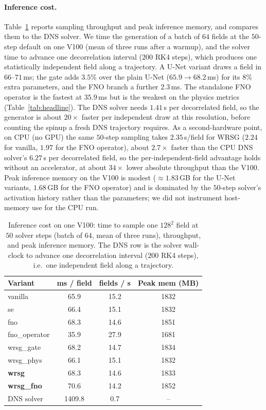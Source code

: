 \documentclass[10pt]{article} %
\begin{document}
\paragraph{Inference cost.} Table~\ref{tab:speed} reports sampling throughput and peak inference memory, and compares them to the DNS solver. We time the generation of a batch of $64$ fields at the $50$-step default on one V100 (mean of three runs after a warmup), and the solver time to advance one decorrelation interval ($200$ RK4 steps), which produces one statistically independent field along a trajectory. A U-Net variant draws a field in $66$--$71$\,ms; the gate adds $3.5\%$ over the plain U-Net ($65.9 \rightarrow 68.2$\,ms) for its $8\%$ extra parameters, and the FNO branch a further $2.3$\,ms. The standalone FNO operator is the fastest at $35.9$\,ms but is the weakest on the physics metrics (Table~\ref{tab:headline}). The DNS solver needs $1.41$\,s per decorrelated field, so the generator is about $20\times$ faster per independent draw at this resolution, before counting the spinup a fresh DNS trajectory requires. As a second-hardware point, on CPU (no GPU) the same $50$-step sampling takes $2.35$\,s/field for WRSG ($2.24$ for vanilla, $1.97$ for the FNO operator), about $2.7\times$ faster than the CPU DNS solver's $6.27$\,s per decorrelated field, so the per-independent-field advantage holds without an accelerator, at about $34\times$ lower absolute throughput than the V100. Peak inference memory on the V100 is modest ($\approx 1.83$\,GB for the U-Net variants, $1.68$\,GB for the FNO operator) and is dominated by the $50$-step solver's activation history rather than the parameters; we did not instrument host-memory use for the CPU run.

\begin{table}[H]
\centering
\caption{Inference cost on one V100: time to sample one $128^2$ field at $50$ solver steps (batch of $64$, mean of three runs), throughput, and peak inference memory. The DNS row is the solver wall-clock to advance one decorrelation interval ($200$ RK4 steps), i.e.\ one independent field along a trajectory.}
\label{tab:speed}
\begin{tabular}{lccc}
\toprule
Variant & ms / field & fields / s & Peak mem (MB) \\
\midrule
vanilla         & 65.9 & 15.2 & 1832 \\
se              & 66.4 & 15.1 & 1832 \\
fno             & 68.3 & 14.6 & 1851 \\
fno\_operator   & 35.9 & 27.9 & 1681 \\
wrsg\_gate      & 68.2 & 14.7 & 1834 \\
wrsg\_phys      & 66.1 & 15.1 & 1832 \\
\textbf{wrsg}   & 68.3 & 14.6 & 1833 \\
\textbf{wrsg\_fno} & 70.6 & 14.2 & 1852 \\
\midrule
DNS solver      & 1409.8 & 0.7 & -- \\
\bottomrule
\end{tabular}
\end{table}
\end{document}
